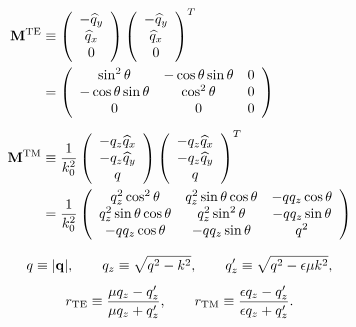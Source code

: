 \documentclass[letterpaper]{article}
\begin{document}
\begin{align*}
 \mathbf{M}^{\text{\scriptsize TE}}
&\equiv
 \left(\begin{array}{c}
 -\widehat{q}_y \\ \widehat{q}_x \\ 0 
 \end{array}\right)
 \left(\begin{array}{c}
 -\widehat{q}_y \\ \widehat{q}_x \\ 0 
 \end{array}\right)^T
\\
&=\left(\begin{array}{ccc}
  \sin^2 \theta & -\cos\theta \sin\theta & 0 \\
  -\cos\theta \sin\theta & \cos^2 \theta & 0 \\
  0 & 0 & 0 
  \end{array}\right)
\\[5pt]
 \mathbf{M}^{\text{\scriptsize TM}}
&\equiv
 \frac{1}{k_0^2}
 \left(\begin{array}{c}
  -q_z \widehat{q}_x \\
  -q_z \widehat{q}_y \\
   q   
 \end{array}\right)
 \left(\begin{array}{c}
  -q_z \widehat{q}_x \\
  -q_z \widehat{q}_y \\
   q   
 \end{array}\right)^T
\\
&= \frac{1}{k_0^2}
  \left(\begin{array}{ccc}
  q_z^2 \cos^2 \theta          & q_z^2 \sin\theta \cos\theta & -q q_z \cos\theta \\
  q_z^2 \sin \theta \cos\theta & q_z^2 \sin^2\theta          & -q q_z \sin\theta \\
  -q q_z \cos\theta            & -q q_z \sin\theta           & q^2
  \end{array}\right)
\end{align*}

$$ q \equiv |\mathbf{q}|,
   \qquad 
   q_z        \equiv \sqrt{ q^2 - k^2 },
   \qquad
   q_z^\prime \equiv \sqrt{ q^2 - \epsilon \mu k^2},
$$
$$
   r_{\text{\scriptsize TE}} \equiv \frac{\mu q_z - q_z^\prime}{\mu q_z + q_z^\prime},
   \qquad
   r_{\text{\scriptsize TM}} \equiv \frac{\epsilon q_z - q_z^\prime}{\epsilon q_z + q_z^\prime}.
$$
\end{document}
